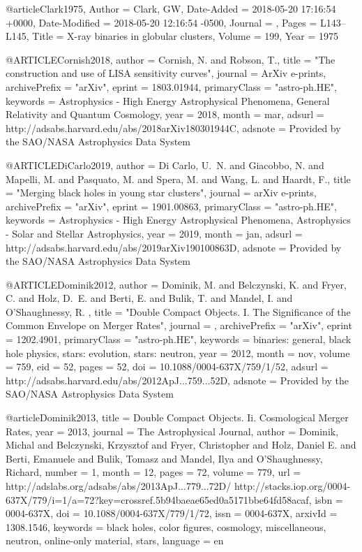 \documentclass[twocolumn,tighten]{aastex63}
\begin{document}
{{{{{@article{Clark1975,
	Author = {Clark, GW},
	Date-Added = {2018-05-20 17:16:54 +0000},
	Date-Modified = {2018-05-20 12:16:54 -0500},
	Journal = {\apj},
	Pages = {L143--L145},
	Title = {X-ray binaries in globular clusters},
	Volume = {199},
	Year = {1975}}

@ARTICLE{Cornish2018,
   author = {{Cornish}, N. and {Robson}, T.},
    title = "{The construction and use of LISA sensitivity curves}",
  journal = {ArXiv e-prints},
archivePrefix = "arXiv",
   eprint = {1803.01944},
 primaryClass = "astro-ph.HE",
 keywords = {Astrophysics - High Energy Astrophysical Phenomena, General Relativity and Quantum Cosmology},
     year = 2018,
    month = mar,
   adsurl = {http://adsabs.harvard.edu/abs/2018arXiv180301944C},
  adsnote = {Provided by the SAO/NASA Astrophysics Data System}
}

@ARTICLE{DiCarlo2019,
   author = {{Di Carlo}, U.~N. and {Giacobbo}, N. and {Mapelli}, M. and {Pasquato}, M. and 
	{Spera}, M. and {Wang}, L. and {Haardt}, F.},
    title = "{Merging black holes in young star clusters}",
  journal = {arXiv e-prints},
archivePrefix = "arXiv",
   eprint = {1901.00863},
 primaryClass = "astro-ph.HE",
 keywords = {Astrophysics - High Energy Astrophysical Phenomena, Astrophysics - Solar and Stellar Astrophysics},
     year = 2019,
    month = jan,
   adsurl = {http://adsabs.harvard.edu/abs/2019arXiv190100863D},
  adsnote = {Provided by the SAO/NASA Astrophysics Data System}
}

@ARTICLE{Dominik2012,
   author = {{Dominik}, M. and {Belczynski}, K. and {Fryer}, C. and {Holz}, D.~E. and 
	{Berti}, E. and {Bulik}, T. and {Mandel}, I. and {O'Shaughnessy}, R.
	},
    title = "{Double Compact Objects. I. The Significance of the Common Envelope on Merger Rates}",
  journal = {\apj},
archivePrefix = "arXiv",
   eprint = {1202.4901},
 primaryClass = "astro-ph.HE",
 keywords = {binaries: general, black hole physics, stars: evolution, stars: neutron},
     year = 2012,
    month = nov,
   volume = 759,
      eid = {52},
    pages = {52},
      doi = {10.1088/0004-637X/759/1/52},
   adsurl = {http://adsabs.harvard.edu/abs/2012ApJ...759...52D},
  adsnote = {Provided by the SAO/NASA Astrophysics Data System}
}

@article{Dominik2013,
    title = {{Double Compact Objects. Ii. Cosmological Merger Rates}},
    year = {2013},
    journal = {The Astrophysical Journal},
    author = {Dominik, Michal and Belczynski, Krzysztof and Fryer, Christopher and Holz, Daniel E. and Berti, Emanuele and Bulik, Tomasz and Mandel, Ilya and O'Shaughnessy, Richard},
    number = {1},
    month = {12},
    pages = {72},
    volume = {779},
    url = {http://adslabs.org/adsabs/abs/2013ApJ...779...72D/ http://stacks.iop.org/0004-637X/779/i=1/a=72?key=crossref.5b94baeae65ed0a5171bbe64fd58acaf},
    isbn = {0004-637X},
    doi = {10.1088/0004-637X/779/1/72},
    issn = {0004-637X},
    arxivId = {1308.1546},
    keywords = {black holes, color figures, cosmology, miscellaneous, neutron, online-only material, stars},
    language = {en}
}

}}}}}
\end{document}
